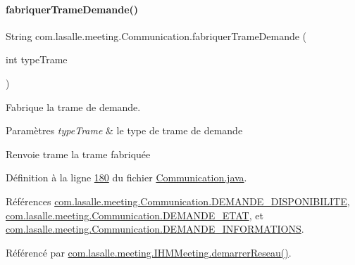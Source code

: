 \paragraph{\texorpdfstring{fabriquer\+Trame\+Demande()}{fabriquerTrameDemande()}}
{\footnotesize\ttfamily String com.\+lasalle.\+meeting.\+Communication.\+fabriquer\+Trame\+Demande (\begin{DoxyParamCaption}\item[{int}]{type\+Trame }\end{DoxyParamCaption})}



Fabrique la trame de demande. 


\begin{DoxyParams}{Paramètres}
{\em type\+Trame} & le type de trame de demande \\
\hline
\end{DoxyParams}
\begin{DoxyReturn}{Renvoie}
trame la trame fabriquée 
\end{DoxyReturn}


Définition à la ligne \hyperlink{_communication_8java_source_l00180}{180} du fichier \hyperlink{_communication_8java_source}{Communication.\+java}.



Références \hyperlink{_communication_8java_source_l00056}{com.\+lasalle.\+meeting.\+Communication.\+D\+E\+M\+A\+N\+D\+E\+\_\+\+D\+I\+S\+P\+O\+N\+I\+B\+I\+L\+I\+TE}, \hyperlink{_communication_8java_source_l00055}{com.\+lasalle.\+meeting.\+Communication.\+D\+E\+M\+A\+N\+D\+E\+\_\+\+E\+T\+AT}, et \hyperlink{_communication_8java_source_l00054}{com.\+lasalle.\+meeting.\+Communication.\+D\+E\+M\+A\+N\+D\+E\+\_\+\+I\+N\+F\+O\+R\+M\+A\+T\+I\+O\+NS}.



Référencé par \hyperlink{_i_h_m_meeting_8java_source_l00082}{com.\+lasalle.\+meeting.\+I\+H\+M\+Meeting.\+demarrer\+Reseau()}.


